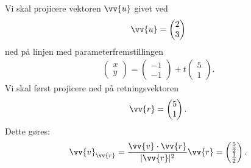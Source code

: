 \begin{exa}
Vi skal projicere vektoren $\vv{u}$ givet ved
\begin{align*}
	\vv{u}=
	\begin{pmatrix}
		2 \\ 3
	\end{pmatrix}
\end{align*}
ned på linjen med parameterfremstillingen 
\begin{align*}
	\begin{pmatrix}
		x \\ y
	\end{pmatrix} =
	\begin{pmatrix}
		-1 \\ -1
	\end{pmatrix}+ t
	\begin{pmatrix}
		5 \\ 1
	\end{pmatrix}.
\end{align*}
Vi skal først projicere ned på retningsvektoren
\begin{align*}
	\vv{r} = 
	\begin{pmatrix}
		5 \\ 1
	\end{pmatrix}.
\end{align*}
Dette gøres:
\begin{align*}
	\vv{v}_{\vv{r}} = \frac{\vv{v}\cdot \vv{r}}{|\vv{r}|^2}\vv{r} = 
	\begin{pmatrix}
		\frac{5}{2} \\ \frac{1}{2}	
	\end{pmatrix}.
\end{align*}
\end{exa}

